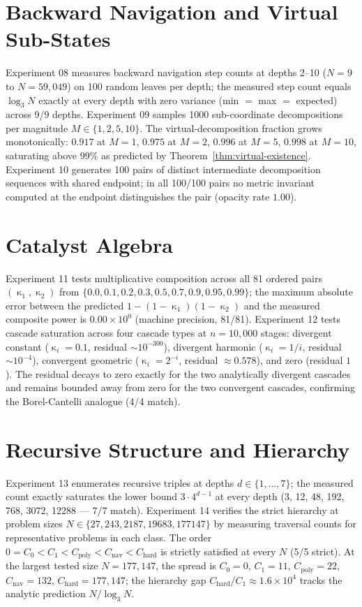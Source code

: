 \documentclass[twocolumn,a4paper]{article}
\DeclareMathOperator{\catpow}{\kappa}
\begin{document}
\section{Backward Navigation and Virtual Sub-States}

Experiment 08 measures backward navigation step counts at depths 2--10 ($N=9$ to $N=59{,}049$) on 100 random leaves per depth; the measured step count equals $\log_{3}N$ exactly at every depth with zero variance (min $=$ max $=$ expected) across 9/9 depths. Experiment 09 samples 1000 sub-coordinate decompositions per magnitude $M \in \{1, 2, 5, 10\}$. The virtual-decomposition fraction grows monotonically: $0.917$ at $M=1$, $0.975$ at $M=2$, $0.996$ at $M=5$, $0.998$ at $M=10$, saturating above $99\%$ as predicted by Theorem~\ref{thm:virtual-existence}. Experiment 10 generates 100 pairs of distinct intermediate decomposition sequences with shared endpoint; in all 100/100 pairs no metric invariant computed at the endpoint distinguishes the pair (opacity rate $1.00$).

\section{Catalyst Algebra}

Experiment 11 tests multiplicative composition across all 81 ordered pairs $(\catpow_{1},\catpow_{2})$ from $\{0.0, 0.1, 0.2, 0.3, 0.5, 0.7, 0.9, 0.95, 0.99\}$; the maximum absolute error between the predicted $1-(1-\catpow_{1})(1-\catpow_{2})$ and the measured composite power is $0.00 \times 10^{0}$ (machine precision, 81/81). Experiment 12 tests cascade saturation across four cascade types at $n=10{,}000$ stages: divergent constant ($\catpow_{i}=0.1$, residual $\sim 10^{-300}$), divergent harmonic ($\catpow_{i}=1/i$, residual $\sim 10^{-4}$), convergent geometric ($\catpow_{i}=2^{-i}$, residual $\approx 0.578$), and zero (residual $1$). The residual decays to zero exactly for the two analytically divergent cascades and remains bounded away from zero for the two convergent cascades, confirming the Borel-Cantelli analogue (4/4 match).

\section{Recursive Structure and Hierarchy}

Experiment 13 enumerates recursive triples at depths $d \in \{1, \ldots, 7\}$; the measured count exactly saturates the lower bound $3 \cdot 4^{d-1}$ at every depth (3, 12, 48, 192, 768, 3072, 12288 — 7/7 match). Experiment 14 verifies the strict hierarchy at problem sizes $N \in \{27, 243, 2187, 19683, 177147\}$ by measuring traversal counts for representative problems in each class. The order $0 = C_{0} < C_{1} < C_{\text{poly}} < C_{\text{nav}} < C_{\text{hard}}$ is strictly satisfied at every $N$ (5/5 strict). At the largest tested size $N = 177{,}147$, the spread is $C_{0}=0$, $C_{1}=11$, $C_{\text{poly}}=22$, $C_{\text{nav}}=132$, $C_{\text{hard}}=177{,}147$; the hierarchy gap $C_{\text{hard}}/C_{1} \approx 1.6 \times 10^{4}$ tracks the analytic prediction $N/\log_{3}N$.
\end{document}
